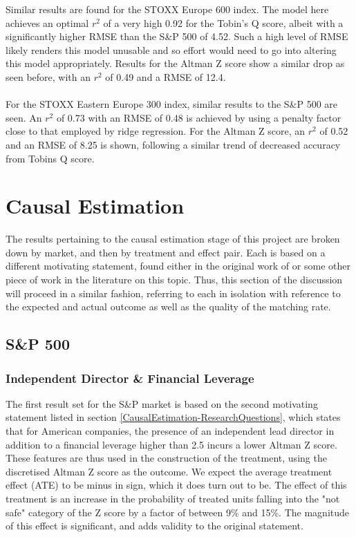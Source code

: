 Similar results are found for the STOXX Europe 600 index. The model here achieves an optimal $r^2$ of a very high 0.92 for the Tobin's Q score, albeit with a significantly higher RMSE than the S\&P 500 of 4.52. Such a high level of RMSE likely renders this model unusable and so effort would need to go into altering this model appropriately. Results for the Altman Z score show a similar drop as seen before, with an $r^2$ of 0.49 and a RMSE of 12.4.\\\\
For the STOXX Eastern Europe 300 index, similar results to the S\&P 500 are seen. An $r^2$ of 0.73 with an RMSE of 0.48 is achieved by using a penalty factor close to that employed by ridge regression. For the Altman Z score, an $r^2$ of 0.52 and an RMSE of 8.25 is shown, following a similar trend of decreased accuracy from Tobins Q score.
\section{Causal Estimation}\label{S.Discussion.causal}
The results pertaining to the causal estimation stage of this project are broken down by market, and then by treatment and effect pair. Each is based on a different motivating statement, found either in the original work of \cite{moldovan2015learning} or some other piece of work in the literature on this topic. Thus, this section of the discussion will proceed in a similar fashion, referring to each in isolation with reference to the expected and actual outcome as well as the quality of the matching rate. 
\subsection{S\&P 500}
\subsubsection{Independent Director \& Financial Leverage}
{The first result set for the S\&P market is based on the second motivating statement listed in section \ref{CausalEstimation-ResearchQuestions}, which states that for American companies, the presence of an independent lead director in addition to a financial leverage higher than 2.5 incurs a lower Altman Z score. These features are thus used in the construction of the treatment, using the discretised Altman Z score as the outcome. We expect the average treatment effect (ATE) to be minus in sign, which it does turn out to be. The effect of this treatment is an increase in the probability of treated units falling into the "not safe" category of the Z score by a factor of between 9\% and 15\%. The magnitude of this effect is significant, and adds validity to the original statement. }
